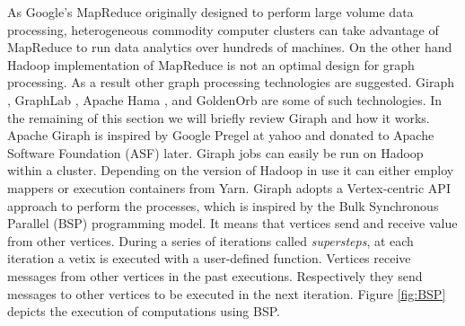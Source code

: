 \documentclass[runningheads,a4paper]{llncs}
\begin{document}
{As Google's MapReduce originally designed to perform large volume data processing, heterogeneous commodity computer clusters can take advantage of MapReduce to run data analytics over hundreds of machines. On the other hand Hadoop implementation of MapReduce is not an optimal design for graph processing. As a result other graph processing technologies are suggested. Giraph \cite{avery2011giraph}, GraphLab \cite{low2014graphlab}, Apache Hama \cite{seo2010hama}, and GoldenOrb  are some of such technologies. In the remaining of this section we will briefly review Giraph and how it works.\\

Apache Giraph is inspired by Google Pregel \cite{malewicz2010pregel} at yahoo and donated to Apache Software Foundation (ASF) later. Giraph jobs can easily be run on Hadoop within a cluster. Depending on the version of Hadoop in use it can either employ mappers or execution containers from Yarn. Giraph adopts a Vertex-centric API approach to perform the processes, which is inspired by the Bulk Synchronous Parallel (BSP) programming model. It means that vertices send and receive value from other vertices. During a series of iterations called \textit{supersteps}, at each iteration a vetix is executed with a user-defined function. Vertices receive messages from other vertices in the past executions. Respectively they send messages to other vertices to be executed in the next iteration. Figure \ref{fig:BSP} depicts the execution of computations using BSP.

}
\end{document}
